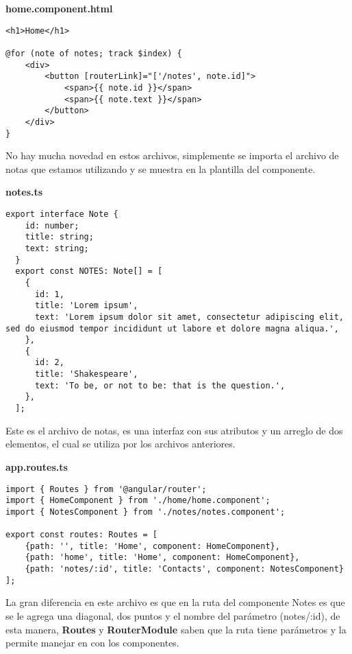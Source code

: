 \textbf{home.component.html}
\begin{lstlisting}[style=htmlcssjs]
<h1>Home</h1>

@for (note of notes; track $index) {
    <div>
        <button [routerLink]="['/notes', note.id]">
            <span>{{ note.id }}</span>
            <span>{{ note.text }}</span>
        </button>
    </div>
}
\end{lstlisting}

No hay mucha novedad en estos archivos, simplemente se importa el archivo de notas que estamos utilizando y se muestra en la plantilla del componente.

\textbf{notes.ts}
\begin{lstlisting}[style=htmlcssjs]
export interface Note {
    id: number;
    title: string;
    text: string;
  }
  export const NOTES: Note[] = [
    {
      id: 1,
      title: 'Lorem ipsum',
      text: 'Lorem ipsum dolor sit amet, consectetur adipiscing elit, sed do eiusmod tempor incididunt ut labore et dolore magna aliqua.',
    },
    {
      id: 2,
      title: 'Shakespeare',
      text: 'To be, or not to be: that is the question.',
    },
  ];
\end{lstlisting}

Este es el archivo de notas, es una interfaz con sus atributos y un arreglo de dos elementos, el cual se utiliza por los archivos anteriores.

\textbf{app.routes.ts}
\begin{lstlisting}[style=htmlcssjs]
import { Routes } from '@angular/router';
import { HomeComponent } from './home/home.component';
import { NotesComponent } from './notes/notes.component';

export const routes: Routes = [
    {path: '', title: 'Home', component: HomeComponent},
    {path: 'home', title: 'Home', component: HomeComponent},
    {path: 'notes/:id', title: 'Contacts', component: NotesComponent}
];

\end{lstlisting}

La gran diferencia en este archivo es que en la ruta del componente Notes es que se le agrega una diagonal, dos puntos y el nombre del parámetro (notes/:id), de esta manera, \textbf{Routes} y \textbf{RouterModule} saben que la ruta tiene parámetros y la permite manejar en con los componentes.